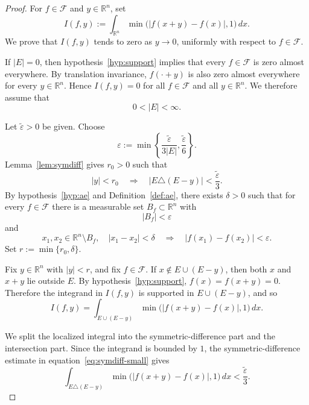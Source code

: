 \documentclass[11pt]{article}
\theoremstyle{plain}
\theoremstyle{definition}
\theoremstyle{remark}
\newcommand{\R}{\mathbb{R}}
\newcommand{\F}{\mathcal{F}}
\newcommand{\eps}{\varepsilon}
\newcommand{\meas}[1]{\lvert #1\rvert}
\begin{document}
\begin{proof}
For $f\in\F$ and $y\in\R^n$, set
\[
    I(f,y):=
    \int_{\R^n}\min\bigl(|f(x+y)-f(x)|,1\bigr)\,dx .
\]
We prove that $I(f,y)$ tends to zero as $y\to0$, uniformly with respect to
$f\in\F$.

If $\meas{E}=0$, then hypothesis~\ref{hyp:support} implies that every
$f\in\F$ is zero almost everywhere. By translation invariance,
$f(\cdot+y)$ is also zero almost everywhere for every $y\in\R^n$. Hence
$I(f,y)=0$ for all $f\in\F$ and all $y\in\R^n$. We therefore assume that
\[
    0<\meas{E}<\infty.
\]

Let $\widetilde\eps>0$ be given. Choose
\begin{equation}\label{eq:epsilon-choice}
    \eps:=
    \min\left\{
        \frac{\widetilde\eps}{3\meas{E}},
        \frac{\widetilde\eps}{6}
    \right\}.
\end{equation}
Lemma~\ref{lem:symdiff} gives $r_0>0$ such that
\begin{equation}\label{eq:symdiff-small}
    |y|<r_0
    \quad\Longrightarrow\quad
    \meas{E\triangle(E-y)}<\frac{\widetilde\eps}{3}.
\end{equation}
By hypothesis~\ref{hyp:ae} and Definition~\ref{def:ae}, there exists
$\delta>0$ such that for every $f\in\F$ there is a measurable set
$B_f\subset\R^n$ with
\begin{equation}\label{eq:exceptional-size}
    \meas{B_f}<\eps
\end{equation}
and
\begin{equation}\label{eq:ae-control}
    x_1,x_2\in\R^n\setminus B_f,\quad |x_1-x_2|<\delta
    \quad\Longrightarrow\quad
    |f(x_1)-f(x_2)|<\eps .
\end{equation}
Set $r:=\min\{r_0,\delta\}$.

Fix $y\in\R^n$ with $|y|<r$, and fix $f\in\F$. If
$x\notin E\cup(E-y)$, then both $x$ and $x+y$ lie outside $E$. By
hypothesis~\ref{hyp:support}, $f(x)=f(x+y)=0$. Therefore the integrand in
$I(f,y)$ is supported in $E\cup(E-y)$, and so
\begin{equation}\label{eq:localization}
    I(f,y)
    =
    \int_{E\cup(E-y)}
    \min\bigl(|f(x+y)-f(x)|,1\bigr)\,dx .
\end{equation}

We split the localized integral into the symmetric-difference part and the
intersection part. Since the integrand is bounded by $1$, the
symmetric-difference estimate in equation~\eqref{eq:symdiff-small} gives
\begin{equation}\label{eq:symdiff-part}
    \int_{E\triangle(E-y)}
    \min\bigl(|f(x+y)-f(x)|,1\bigr)\,dx
    <\frac{\widetilde\eps}{3}.
\end{equation}


\end{proof}
\end{document}
